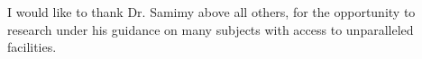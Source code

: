 \begin{acknowledgements}
I would like to thank Dr. Samimy above all others, for the opportunity to research under his guidance on many subjects with access to unparalleled facilities.
\end{acknowledgements}

